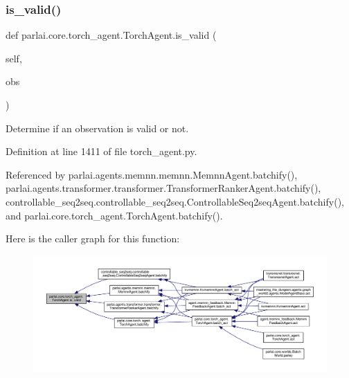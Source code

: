 \subsubsection{\texorpdfstring{is\+\_\+valid()}{is\_valid()}}
{\footnotesize\ttfamily def parlai.\+core.\+torch\+\_\+agent.\+Torch\+Agent.\+is\+\_\+valid (\begin{DoxyParamCaption}\item[{}]{self,  }\item[{}]{obs }\end{DoxyParamCaption})}

\begin{DoxyVerb}Determine if an observation is valid or not.\end{DoxyVerb}
 

Definition at line 1411 of file torch\+\_\+agent.\+py.



Referenced by parlai.\+agents.\+memnn.\+memnn.\+Memnn\+Agent.\+batchify(), parlai.\+agents.\+transformer.\+transformer.\+Transformer\+Ranker\+Agent.\+batchify(), controllable\+\_\+seq2seq.\+controllable\+\_\+seq2seq.\+Controllable\+Seq2seq\+Agent.\+batchify(), and parlai.\+core.\+torch\+\_\+agent.\+Torch\+Agent.\+batchify().

Here is the caller graph for this function\+:
\nopagebreak
\begin{figure}[H]
\begin{center}
\leavevmode
\includegraphics[width=350pt]{classparlai_1_1core_1_1torch__agent_1_1TorchAgent_afa491bf2384b017711ad722b5341b405_icgraph}
\end{center}
\end{figure}
\mbox{\label{classparlai_1_1core_1_1torch__agent_1_1TorchAgent_a32921aa09a682ee752d4822a5f5ebbb4}} 
